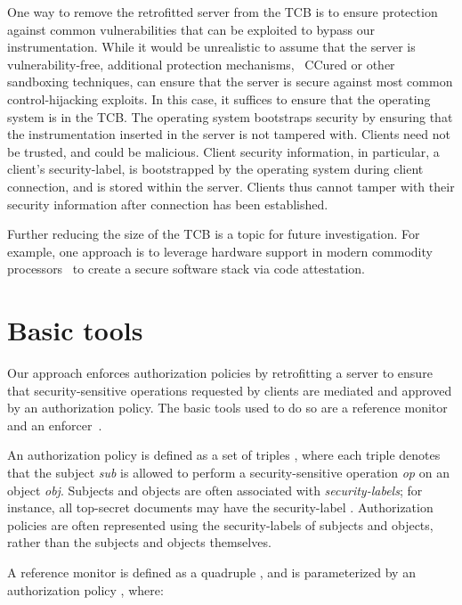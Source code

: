 One way to remove the retrofitted server from the TCB is to ensure protection
against common vulnerabilities that can be exploited to bypass our
instrumentation. While it would be unrealistic to assume that the server is
vulnerability-free, additional protection mechanisms, \eg~CCured or other
sandboxing techniques, can ensure that the server is secure against most common
control-hijacking exploits. In this case, it suffices to ensure that the
operating system is in the TCB. The operating system bootstraps security by
ensuring that the instrumentation inserted in the server is not tampered with.
Clients need not be trusted, and could be malicious. Client security
information, in particular, a client's security-label, is bootstrapped by the
operating system during client connection, and is stored within the server.
Clients thus cannot tamper with their security information after connection has
been established. 

Further reducing the size of the TCB is a topic for future investigation. For
example, one approach is to leverage hardware support in modern commodity
processors~\cite{mpp+07} to create a secure software stack via code
attestation.


\section{Basic tools}
\label{chapter:overview:basictools}

Our approach enforces authorization policies by retrofitting a server to ensure
that security-sensitive operations requested by clients are mediated and
approved by an authorization policy. The basic tools used to do so are a
reference monitor and an enforcer~\cite{a72}.

An authorization policy is defined as a set of triples
, where each triple denotes
that the subject \textit{sub} is allowed to perform a security-sensitive
operation \textit{op} on an object \textit{obj}. Subjects and objects are often
associated with \textit{security-labels}; for instance, all top-secret
documents may have the security-label . Authorization
policies are often represented using the security-labels of subjects and
objects, rather than the subjects and objects themselves.

A reference monitor is defined as a quadruple
\quadruple{\events}{\state}{\update}{\return}, and is parameterized by an
authorization policy \policy, where: 

